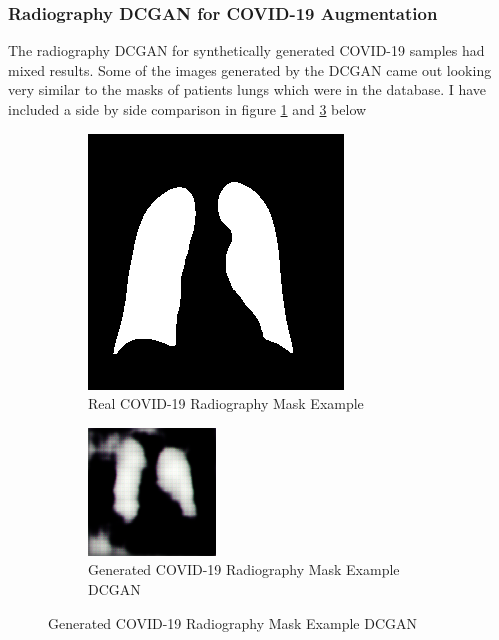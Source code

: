 \subsubsection{Radiography DCGAN for COVID-19 Augmentation}
The radiography DCGAN for synthetically generated COVID-19 samples had mixed results.  Some of the images generated by the DCGAN came out looking very similar to the masks of patients lungs which were in the database.  I have included a side by side comparison in figure \ref{fig:Real COVID-19 Radiography Mask Example} and \ref{fig:Synthetically Generated COVID-19 Radiography Mask Example DCGAN} below
 \begin{figure}[H]
    \centering
    \begin{subfigure}{.5\textwidth}
    \centering
      \includegraphics[width=.4\linewidth,keepaspectratio]{Images/Radiography_Real_Mask_COVID19_Example.png}
      \caption{Real COVID-19 Radiography Mask Example}
      \label{fig:Real COVID-19 Radiography Mask Example}
    \end{subfigure}%
    \begin{subfigure}{.5\textwidth}
    \centering
      \includegraphics[width=.4\linewidth,keepaspectratio]{Images/Radiography_GAN_Mask_COVID19_Example.png}
      \caption{Generated COVID-19 Radiography Mask Example DCGAN}
      \label{fig:Synthetically Generated COVID-19 Radiography Mask Example DCGAN}
    \end{subfigure}%
\end{figure}
